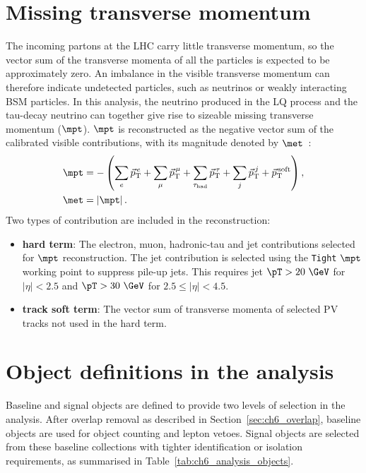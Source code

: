 \section{Missing transverse momentum}
\label{sec:ch6_met}

The incoming partons at the LHC carry little transverse momentum, so the vector sum of the transverse momenta of all the particles is expected to be approximately zero.
An imbalance in the visible transverse momentum can therefore indicate undetected particles, such as neutrinos or weakly interacting BSM particles.
In this analysis, the neutrino produced in the LQ process and the tau-decay neutrino can together give rise to sizeable missing transverse momentum ($\mpt$).
$\mpt$ is reconstructed as the negative vector sum of the calibrated visible contributions, with its magnitude denoted by $\met$~\cite{ATLAS2025METPerformance}:
\begin{align}
    \mpt
    &=-\left(
    \sum_e\vec p_{\mathrm{T}}^{\,e}
    +\sum_\mu\vec p_{\mathrm{T}}^{\,\mu}
    +\sum_{\tau_{\mathrm{had}}}\vec p_{\mathrm{T}}^{\,\tau}
    +\sum_j\vec p_{\mathrm{T}}^{\,j}
    +\vec p_{\mathrm{T}}^{\,\mathrm{soft}}
    \right),
    \label{eq:ch6_met_vector}\\
    \met&=\left|\mpt\right|.
    \label{eq:ch6_met_magnitude}
\end{align}
Two types of contribution are included in the reconstruction:
\begin{itemize}
    \item \textbf{hard term}: The electron, muon, hadronic-tau and jet contributions selected for $\mpt$ reconstruction.
    The jet contribution is selected using the \texttt{Tight} $\mpt$ working point to suppress pile-up jets.
    This requires jet $\pT>20~\GeV$ for $|\eta|<2.5$ and $\pT>30~\GeV$ for $2.5\leq|\eta|<4.5$.
    \item \textbf{track soft term}: The vector sum of transverse momenta of selected PV tracks not used in the hard term.
\end{itemize}

\section{Object definitions in the analysis}
\label{sec:ch6_analysis_objects}

Baseline and signal objects are defined to provide two levels of selection in the analysis.
After overlap removal as described in Section~\ref{sec:ch6_overlap}, baseline objects are used for object counting and lepton vetoes.
Signal objects are selected from these baseline collections with tighter identification or isolation requirements, as summarised in Table~\ref{tab:ch6_analysis_objects}.

